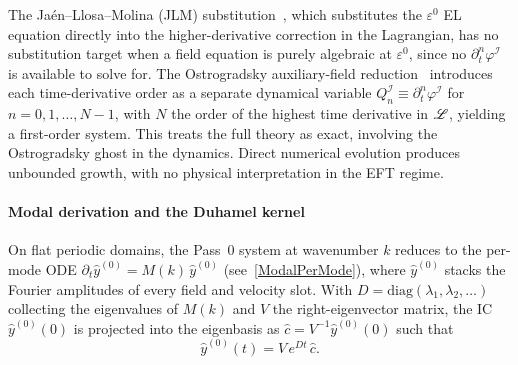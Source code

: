 The Ja{\'e}n--Llosa--Molina (JLM) substitution~\cite{jaen1986reduction}, which substitutes the
$\varepsilon^0$ EL equation directly into the higher-derivative correction in
the Lagrangian, has no substitution target when a field equation is purely algebraic at
$\varepsilon^0$, since no $\partial_t^n\varphi^{\mathcal{I}}$ is available to solve for. The
Ostrogradsky auxiliary-field reduction~\cite{ostrogradsky1850memoires,Woodard:2015zca}
introduces each time-derivative order as a separate dynamical variable
$Q_n^{\mathcal{I}} \equiv \partial_t^n\varphi^{\mathcal{I}}$ for $n = 0, 1, \ldots, N-1$,
with $N$ the order of the highest time derivative in $\mathscr{L}$, yielding a first-order
system. This treats the full
theory as exact, involving the Ostrogradsky ghost in the dynamics. Direct
numerical evolution produces unbounded growth, with no physical
interpretation in the EFT regime.

\paragraph*{Modal derivation and the Duhamel kernel}
On flat periodic domains, the Pass~0 system at wavenumber $k$ reduces to the per-mode
ODE $\partial_t\hat{y}^{(0)} = M(k)\,\hat{y}^{(0)}$ (see~\cref{ModalPerMode}), where
$\hat{y}^{(0)}$ stacks the Fourier amplitudes of every field and velocity slot.
With $D = \mathrm{diag}(\lambda_1,\lambda_2,\ldots)$ collecting the eigenvalues of $M(k)$
and $V$ the right-eigenvector matrix, the IC $\hat{y}^{(0)}(0)$ is projected
into the eigenbasis as $\hat{c} = V^{-1}\hat{y}^{(0)}(0)$ such that
\begin{equation}
  \hat{y}^{(0)}(t) = V\,e^{Dt}\,\hat{c}.
  \label{PassZeroSolution}
\end{equation}

